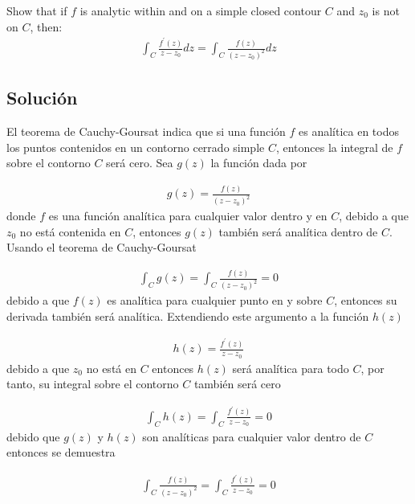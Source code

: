 \begin{problem}{3}
    Show that if $f$ is analytic within and on a simple closed contour $C$ and $z_0$ is not on $C$, then: 
    \begin{gather}
        \int_C \frac{f^{\prime}(z)}{z - z_0}dz = \int_C \frac{f(z)}{(z - z_0)^2}dz 
    \end{gather}   
\end{problem}

\subsection*{Solución}

El teorema de Cauchy-Goursat indica que si una función $f$ es analítica en todos los puntos contenidos en un contorno cerrado simple $C$, entonces la integral de $f$ sobre el contorno $C$ será cero. Sea $g(z)$ la función dada por


\begin{gather*}
    g(z) = \frac{f(z)}{(z - z_0)^2}
\end{gather*}
donde $f$ es una función analítica para cualquier valor dentro y en $C$, debido a que $z_0$ no está contenida en $C$, entonces $g(z)$ también será analítica dentro de $C$. Usando el teorema de Cauchy-Goursat

\begin{gather}
    \int_C g(z) = \int_C \frac{f(z)}{(z - z_0)^2} = 0
\end{gather}
debido a que $f(z)$ es analítica para cualquier punto en y sobre $C$, entonces su derivada también será analítica. Extendiendo este argumento a la función $h(z)$ 

\begin{gather*}
    h(z) = \frac{f^{\prime}(z)}{z - z_0}
\end{gather*}
debido a que $z_0$ no está en $C$ entonces $h(z)$ será analítica para todo $C$, por tanto, su integral sobre el contorno $C$ también será cero

\begin{gather}
    \int_C h(z) = \int_C \frac{f^{\prime}(z)}{z - z_0} = 0
\end{gather}
debido que $g(z)$ y $h(z)$ son analíticas para cualquier valor dentro de $C$ entonces se demuestra

\begin{result}
    \begin{gather}
    \int_C \frac{f(z)}{(z - z_0)^2}  = \int_C \frac{f^{\prime}(z)}{z - z_0} = 0  
    \end{gather}
\end{result}

